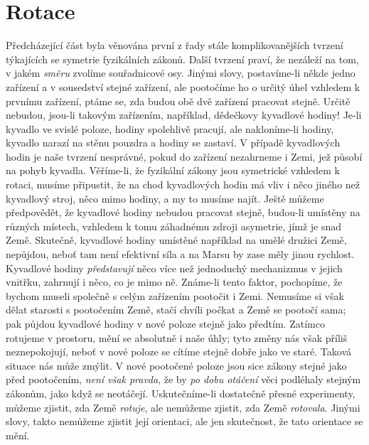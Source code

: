   \section{Rotace}
    Předcházející část byla věnována první z řady stále komplikovanějších tvrzení týkajících se 
    symetrie fyzikálních zákonů. Další tvrzení praví, že nezáleží na tom, v jakém \emph{směru} 
    zvolíme souřadnicové osy. Jinými slovy, postavíme-li někde jedno zařízení a v sousedství 
    stejné zařízení, ale pootočíme ho o určitý úhel vzhledem k prvnímu zařízení, ptáme se, zda 
    budou obě dvě zařízení pracovat stejně. Určitě nebudou, jsou-li takovým zařízením, například, 
    dědečkovy kyvadlové hodiny! Je-li kyvadlo ve svislé poloze, hodiny spolehlivě pracují, ale 
    nakloníme-li hodiny, kyvadlo narazí na stěnu pouzdra a hodiny se zastaví. V případě kyvadlových 
    hodin je naše tvrzení nesprávné, pokud do zařízení nezahrneme i Zemi, jež působí na pohyb 
    kyvadla. Věříme-li, že fyzikální zákony jsou symetrické vzhledem k rotaci, musíme připustit, že 
    na chod kyvadlových hodin má vliv i něco jiného než kyvadlový stroj, něco mimo hodiny, a my to 
    musíme najít. Ještě můžeme předpovědět, že kyvadlové hodiny nebudou pracovat stejně, budou-li 
    umístěny na různých místech, vzhledem k tomu záhadnému zdroji asymetrie, jímž je snad Země. 
    Skutečně, kyvadlové hodiny umístěné například na umělé družici Země, nepůjdou, neboť tam není 
    efektivní síla a na Marsu by zase měly jinou rychlost. Kyvadlové hodiny \emph{představují} něco 
    více než jednoduchý mechanizmus v jejich vnitřku, zahrnují i něco, co je mimo ně. Známe-li 
    tento faktor, pochopíme, že bychom museli společně s celým zařízením pootočit i Zemi. Nemusíme 
    si však dělat starosti s pootočením Země, stačí chvíli počkat a Země se pootočí sama; pak 
    půjdou kyvadlové hodiny v nové poloze stejně jako předtím. Zatímco rotujeme v prostoru, mění se 
    absolutně i naše úhly; tyto změny nás však příliš neznepokojují, neboť v nové poloze se cítíme 
    stejně dobře jako ve staré. Taková situace nás může zmýlit. V nové pootočené poloze jsou sice 
    zákony stejné jako před pootočením, \emph{není však pravda}, že by \emph{po dobu otáčení} věci 
    podléhaly stejným zákonům, jako když se neotáčejí. Uskutečníme-li dostatečně přesné 
    experimenty, můžeme zjistit, zda Země \emph{rotuje}, ale nemůžeme zjistit, zda Země 
    \emph{rotovala}. Jinými slovy, takto nemůžeme zjistit její orientaci, ale jen skutečnost, že 
    tato orientace se mění.

